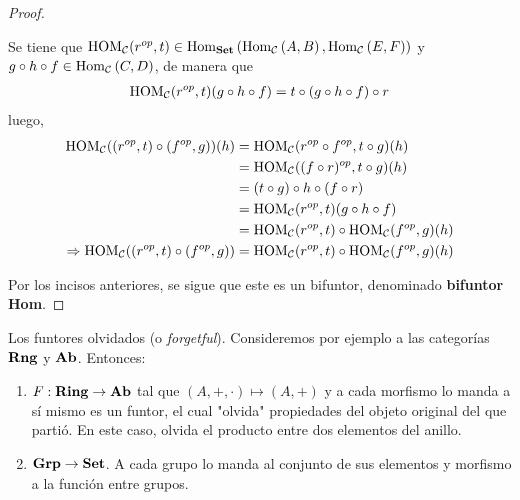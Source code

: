 \documentclass[12pt]{report}
\newcounter{it}
\theoremstyle{largebreak}
\newcommand\cf[3]{\ensuremath{#1:#2\rightarrow#3}}
\newcommand{\Hom}[3]{\ensuremath{\textup{Hom}_{#1}\left(#2,#3\right)}}
\newcommand{\Cat}[1]{\ensuremath{\textup{\textbf{#1}}}}
\begin{document}
\begin{proof}
\begin{enumerate}
            Se tiene que $\HOM{\mathcal{C}}(r^{op},t)\in\Hom{\Cat{Set}}{\Hom{\mathcal{C}}{A}{B}}{\Hom{\mathcal{C}}{E}{F}}$ y $g\circ h\circ f\in \Hom{\mathcal{C}}{C}{D}$, de manera que
            \begin{equation*}
                \begin{split}
                    \textup{HOM}_{\mathcal{C}}(r^{op},t)(g\circ h\circ f)&=t\circ (g\circ h\circ f)\circ r\\                    
                \end{split}
            \end{equation*}
            luego,
            \begin{equation*}
                \begin{split}
                    \textup{HOM}_{\mathcal{C}}((r^{op},t)\circ (f^{op},g))(h)
                    &=\textup{HOM}_{\mathcal{C}}(r^{op}\circ f^{op},t\circ g)(h)\\
                    &=\textup{HOM}_{\mathcal{C}}((f\circ r)^{op},t\circ g)(h)\\
                    &=(t\circ g)\circ h\circ (f\circ r)\\
                    &=\textup{HOM}_{\mathcal{C}}(r^{op}, t)(g\circ h\circ f)\\
                    &=\textup{HOM}_{\mathcal{C}}(r^{op},t)\circ\textup{HOM}_{\mathcal{C}}(f^{op},g)(h)\\
                    \Rightarrow \textup{HOM}_{\mathcal{C}}((r^{op},t)\circ (f^{op},g))&=\textup{HOM}_{\mathcal{C}}(r^{op},t)\circ\textup{HOM}_{\mathcal{C}}(f^{op},g)(h)\\
                \end{split}
            \end{equation*}
        \end{enumerate}
        Por los incisos anteriores, se sigue que este es un bifuntor, denominado \textbf{bifuntor Hom}.
    \end{proof}

    \begin{exa}
        Los funtores olvidados (o \textit{forgetful}). Consideremos por ejemplo a las categorías $\Cat{Rng}$ y $\Cat{Ab}$. Entonces:
        \begin{enumerate}
            \item $\cf{F}{\Cat{Ring}}{\Cat{Ab}}$ tal que $(A,+,\cdot)\mapsto (A,+)$ y a cada morfismo lo manda a sí mismo es un funtor, el cual "olvida" propiedades del objeto original del que partió. En este caso, olvida el producto entre dos elementos del anillo.
            \item $\Cat{Grp}\rightarrow\Cat{Set}$. A cada grupo lo manda al conjunto de sus elementos y morfismo a la función entre grupos.
        \end{enumerate}
    \end{exa}
\end{document}

